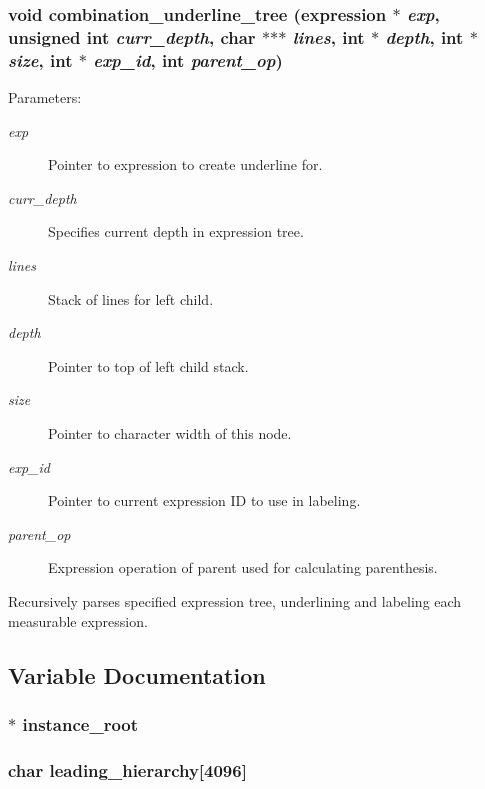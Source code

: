 \subsubsection{\setlength{\rightskip}{0pt plus 5cm}void combination\_\-underline\_\-tree ({\bf expression} $\ast$ {\em exp}, unsigned int {\em curr\_\-depth}, char $\ast$$\ast$$\ast$ {\em lines}, int $\ast$ {\em depth}, int $\ast$ {\em size}, int $\ast$ {\em exp\_\-id}, int {\em parent\_\-op})}\label{comb_8c_a12}


\begin{Desc}
\item[Parameters: ]\par
\begin{description}
\item[{\em 
exp}]Pointer to expression to create underline for. \item[{\em 
curr\_\-depth}]Specifies current depth in expression tree. \item[{\em 
lines}]Stack of lines for left child. \item[{\em 
depth}]Pointer to top of left child stack. \item[{\em 
size}]Pointer to character width of this node. \item[{\em 
exp\_\-id}]Pointer to current expression ID to use in labeling. \item[{\em 
parent\_\-op}]Expression operation of parent used for calculating parenthesis.\end{description}
\end{Desc}
Recursively parses specified expression tree, underlining and labeling each measurable expression. 

\subsection{Variable Documentation}
\subsubsection{$\ast$ instance\_\-root}\label{comb_8c_a0}


\subsubsection{\setlength{\rightskip}{0pt plus 5cm}char leading\_\-hierarchy[4096]}\label{comb_8c_a5}


